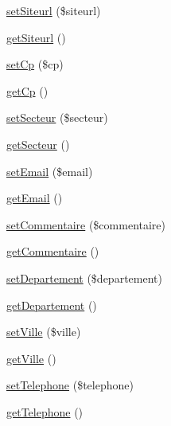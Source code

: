 \begin{DoxyCompactItemize}
\item 
\hyperlink{class_acme_group_1_1_labo_bundle_1_1_entity_1_1magasin_a775ebb706ffed1a5cc7f5de07739dd32}{set\+Siteurl} (\$siteurl)
\item 
\hyperlink{class_acme_group_1_1_labo_bundle_1_1_entity_1_1magasin_aec9aabe5e1304d8e77c1f2750f6baa33}{get\+Siteurl} ()
\item 
\hyperlink{class_acme_group_1_1_labo_bundle_1_1_entity_1_1magasin_a97b4dfc5670541598df4fb4959e6ecfc}{set\+Cp} (\$cp)
\item 
\hyperlink{class_acme_group_1_1_labo_bundle_1_1_entity_1_1magasin_a1c1c95dee862cf0d7ea8d7db8796ac5a}{get\+Cp} ()
\item 
\hyperlink{class_acme_group_1_1_labo_bundle_1_1_entity_1_1magasin_a2be7d0dee102e1fb624952c52c8bc85d}{set\+Secteur} (\$secteur)
\item 
\hyperlink{class_acme_group_1_1_labo_bundle_1_1_entity_1_1magasin_a9c103a492c5767f1c21f2449e1d54367}{get\+Secteur} ()
\item 
\hyperlink{class_acme_group_1_1_labo_bundle_1_1_entity_1_1magasin_a2503687fed4ccede4bc4310ba5ea6960}{set\+Email} (\$email)
\item 
\hyperlink{class_acme_group_1_1_labo_bundle_1_1_entity_1_1magasin_ab94deb263866f789fdd8b62150b29908}{get\+Email} ()
\item 
\hyperlink{class_acme_group_1_1_labo_bundle_1_1_entity_1_1magasin_a035ad7b0f64f6d91cf5804e2c1201b47}{set\+Commentaire} (\$commentaire)
\item 
\hyperlink{class_acme_group_1_1_labo_bundle_1_1_entity_1_1magasin_a293ca91d1db62c8297a14c207147ee98}{get\+Commentaire} ()
\item 
\hyperlink{class_acme_group_1_1_labo_bundle_1_1_entity_1_1magasin_a129154af2cf7b631dbafe7df53c83403}{set\+Departement} (\$departement)
\item 
\hyperlink{class_acme_group_1_1_labo_bundle_1_1_entity_1_1magasin_a8f6a08848bed31681ce6ed6c765a9ad7}{get\+Departement} ()
\item 
\hyperlink{class_acme_group_1_1_labo_bundle_1_1_entity_1_1magasin_a3aa7a37201e68a26727f727ab9a36526}{set\+Ville} (\$ville)
\item 
\hyperlink{class_acme_group_1_1_labo_bundle_1_1_entity_1_1magasin_acd692c6cefe5cf44f10e0f2daae35028}{get\+Ville} ()
\item 
\hyperlink{class_acme_group_1_1_labo_bundle_1_1_entity_1_1magasin_a43a5c1e437f8600560c484c73132bdb2}{set\+Telephone} (\$telephone)
\item 
\hyperlink{class_acme_group_1_1_labo_bundle_1_1_entity_1_1magasin_a7bbf514cb3a5a55eb111f054b5de0e0d}{get\+Telephone} ()

\end{DoxyCompactItemize}
